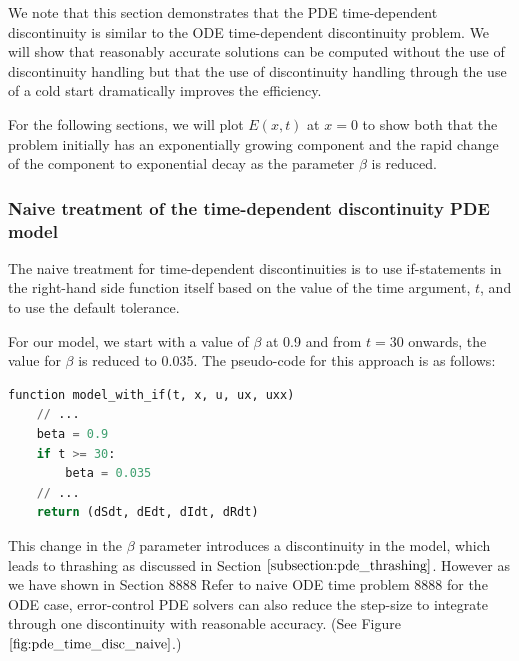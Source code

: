 \documentclass{article}
\begin{document}
We note that this section demonstrates that the PDE time-dependent discontinuity is similar to the ODE time-dependent discontinuity problem. We will show that reasonably accurate solutions can be computed without the use of discontinuity handling but that the use of discontinuity handling through the use of a cold start dramatically improves the efficiency.

For the following sections, we will plot $E(x, t)$ at $x=0$ to show both that the problem initially has an exponentially growing component and the rapid change of the component to exponential decay as the parameter $\beta$ is reduced.

\subsubsection{Naive treatment of the time-dependent discontinuity PDE model}
\label{subsubsection:pde_time_naive}
The naive treatment for time-dependent discontinuities is to use if-statements in the right-hand side function itself based on the value of the time argument, $t$, and to use the default tolerance.

For our model, we start with a value of $\beta$ at 0.9 and from $t=30$ onwards, the value for $\beta$ is reduced to 0.035. The pseudo-code for this approach is as follows:

\begin{minipage}{\linewidth}
\begin{lstlisting}[language=Python]
function model_with_if(t, x, u, ux, uxx)
	// ...
	beta = 0.9
	if t >= 30:
		beta = 0.035
	// ...
	return (dSdt, dEdt, dIdt, dRdt)

\end{lstlisting}
\end{minipage}

This change in the $\beta$ parameter introduces a discontinuity in the model, which leads to thrashing as discussed in Section $\ref{subsection:pde_thrashing}$. However as we have shown in Section 8888 Refer to naive ODE time problem 8888 for the ODE case, error-control PDE solvers can also reduce the step-size to integrate through one discontinuity with reasonable accuracy. (See Figure $\ref{fig:pde_time_disc_naive}$.)
\end{document}
